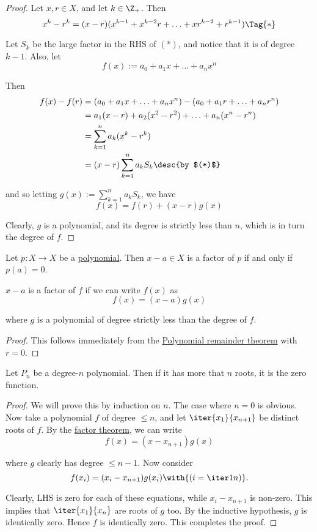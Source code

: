 \begin{proof}
  Let $x,r\in X$, and let $k\in\Z_+$. Then
  \begin{equation*}
    x^k-r^k=(x-r)(x^{k-1}+x^{k-2}r+\ldots+xr^{k-2}+r^{k-1})\Tag{*}
  \end{equation*}

  Let $S_k$ be the large factor in the RHS of $(*)$, and notice that it is of
  degree $k-1$. Also, let
  $$
    f(x):=a_0+a_1x+\ldots+a_nx^n
  $$

  Then
  \begin{align*}
    f(x)-f(r) &=(a_0+a_1x+\ldots+a_nx^n)-(a_0+a_1r+\ldots+a_nr^n) \\
              &=a_1(x-r)+a_2(x^2-r^2)+\ldots+a_n(x^n-r^n)         \\
              &=\sum_{k=1}^na_k(x^k-r^k)                          \\
              &=(x-r)\sum_{k=1}^na_kS_k\desc{by $(*)$}
  \end{align*}

  and so letting $g(x):=\sum_{k=1}^na_kS_k$, we have
  $$
    f(x)=f(r)+(x-r)g(x)
  $$

  Clearly, $g$ is a polynomial, and its degree is strictly less than $n$, which
  is in turn the degree of $f$.
\end{proof}

\label{b02bc72}

Let $p:X\to X$ be a \href{bdde0f1}{polynomial}. Then $x-a\in X$ is a factor of
$p$ if and only if $p(a)=0$.

$x-a$ is a factor of $f$ if we can write $f(x)$ as
$$
  f(x)=(x-a)g(x)
$$

where $g$ is a polynomial of degree strictly less than the degree of $f$.

\begin{proof}
  This follows immediately from the \href{c324c1e}{Polynomial remainder theorem}
  with $r=0$.
\end{proof}

\label{ea3fbed}

Let $P_n$ be a degree-$n$ polynomial. Then if it has more that $n$ roots, it is
the zero function.

\begin{proof}
  We will prove this by induction on $n$. The case where $n=0$ is obvious. Now
  take a polynomial $f$ of degree $\leq n$, and let $\iter{x_1}{x_{n+1}}$ be
  distinct roots of $f$. By the \href{b02bc72}{factor theorem}, we can write
  $$
    f(x)=(x-x_{n+1})g(x)
  $$

  where $g$ clearly has degree $\leq n-1$. Now consider
  $$
    f(x_i)=(x_i-x_{n+1})g(x_i)\with{(i=\iter1n)}.
  $$

  Clearly, LHS is zero for each of these equations, while $x_i-x_{n+1}$ is
  non-zero. This implies that $\iter{x_1}{x_n}$ are roots of $g$ too. By the
  inductive hypothesis, $g$ is identically zero. Hence $f$ is identically zero.
  This completes the proof.
\end{proof}

